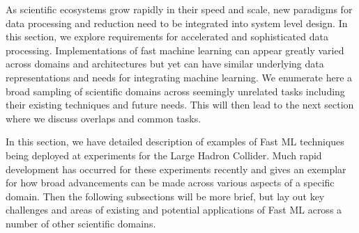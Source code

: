 \noindent 

As scientific ecosystems grow rapidly in their speed and scale, new paradigms for data processing and reduction need to be integrated into system level design.  In this section, we explore requirements for accelerated and sophisticated data processing.  Implementations of fast machine learning can appear greatly varied across domains and architectures but yet can have similar underlying data representations and needs for integrating machine learning.  We enumerate here a broad sampling of scientific domains across seemingly unrelated tasks including their existing techniques and future needs.  This will then lead to the next section where we discuss overlaps and common tasks.

In this section, we have detailed description of examples of Fast ML techniques being deployed at experiments for the Large Hadron Collider.  Much rapid development has occurred for these experiments recently and gives an exemplar for how broad advancements can be made across various aspects of a specific domain.  Then the following subsections will be more brief, but lay out key challenges and areas of existing and potential applications of Fast ML across a number of other scientific domains.  




